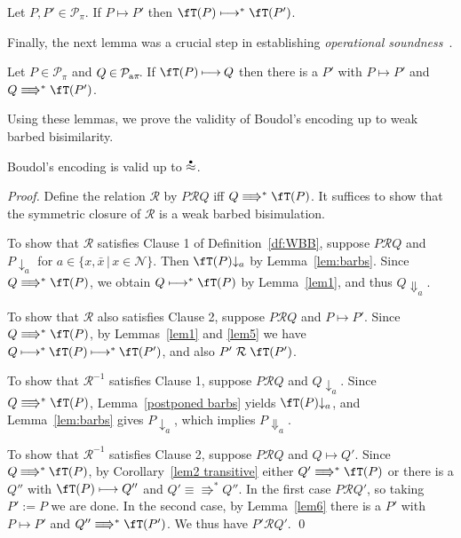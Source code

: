 \documentclass[runningheads]{llncs}
\newcommand{\df}[1]{Definition~\ref{df:#1}}
\newcommand{\lem}[1]{Lemma~\ref{lem:#1}}
\newcommand{\T}{\mathcal{P}}             %
\newcommand{\bbT}{\T}
\newcommand{\wbb}{\stackrel{\raisebox{-1pt}[0pt][0pt]{$\scriptscriptstyle \bullet$}}{\approx}}
\newcommand{\wcomm}{\ocomm}
\newcommand{\scomm}{\sbarb}
\newcommand{\sbarb}[1]{{\downarrow_{#1}}}
\newcommand{\ocomm}[1]{{\Downarrow_{#1}}}
\newcommand{\mrel}{\ensuremath{\mathrel{\mathcal{R}}}}
\newcommand{\pims}{\pi}
\newcommand{\pima}{{\rm a\pi}}
\newcommand{\sI}{\fT}
\begin{document}
\begin{lemma}[\cite{vG18a}]\label{lem5}
Let $P,P' \mathbin\in \bbT_{\pims}$.
If $P \longmapsto P'$ then $\sI(P) \longmapsto^* \sI(P')$.
\end{lemma}

\noindent
Finally, the next lemma was a crucial step in establishing \emph{operational soundness}~\cite{Gorla10a}.

\begin{lemma}[\cite{vG18a}]\label{lem6}\rm
Let $P \mathbin\in \bbT_{\pims}\!$ and $Q \mathbin\in \bbT_{\pima}\!$.
If $\sI(P) \mathbin{\longmapsto} Q$ then there is a $P'$ with $P \longmapsto P'$
and $Q\equiv\!\Rrightarrow^* \sI(P')$.
\end{lemma}

\noindent
Using these lemmas, we prove the validity of Boudol's encoding up to weak barbed bisimilarity.

\begin{theorem}\label{thm:boudolwrequ}\rm
Boudol's encoding is valid up to $\wbb$.
\end{theorem}

\newcommand{\rel}{\mrel}
\begin{proof}
Define the relation $\rel$ by $P\rel Q$ iff $Q \mathrel{\equiv\!\Rrightarrow^*} \sI(P)$.
It suffices to show that the symmetric closure of $\rel$ is a weak barbed bisimulation.

To show that $\rel$ satisfies Clause 1 of \df{WBB},
suppose $P \rel Q$ and $P \scomm a$ for $a \in \{ x, \bar x \,|\, x \in \mathcal N \}$.
Then $\sI(P) \scomm a$ by \lem{barbs}.
Since  $Q \mathrel{\equiv\!\Rrightarrow^*} \sI(P)$, we obtain $Q \longmapsto^* \sI(P)$ by Lemma~\ref{lem1}, and
thus $Q \wcomm a$.\pagebreak[3]

To show that $\rel$ also satisfies Clause 2,
suppose $P \rel Q$ and $P \longmapsto P'$. Since $Q \mathrel{\equiv\!\Rrightarrow^*} \sI(P)$, by
Lemmas~\ref{lem1} and \ref{lem5} we have $Q \mathbin{\longmapsto^*} \sI(P) \mathbin{\longmapsto^*} \sI(P')$, and also $P' \rel \sI(P')$.

To show that $\rel^{-1}$ satisfies Clause 1, suppose $P \rel Q$ and $Q \scomm a$.
Since $Q \mathrel{\equiv\!\Rrightarrow^*} \sI(P)$, Lemma~\ref{postponed barbs} yields \mbox{$\sI(P) \scomm a$},
and \lem{barbs} gives $P \scomm a$, which implies $P \wcomm a$.

To show that $\rel^{-1}$ satisfies Clause 2, suppose
$P \rel Q$ and $Q \longmapsto Q'$. Since $Q \mathbin{\equiv\!\Rrightarrow^*} \sI(P)$, by
Corollary~\ref{lem2 transitive} either $Q' \equiv\!\Rrightarrow^* \sI(P)$
or there is a $Q''$ with $\sI(P) \longmapsto Q''$ and $Q' \mathbin{\equiv\!\Rrightarrow^*} Q''\!$.
In the first case $P \rel Q'$, so taking $P':=P$ we are done.
In the second case, by Lemma~\ref{lem6} there is a $P'$ with $P \longmapsto P'$ and $Q'' \equiv\!\Rrightarrow^* \sI(P')$.
We thus have $P' \rel Q'$.
\qed
\end{proof}
\end{document}
